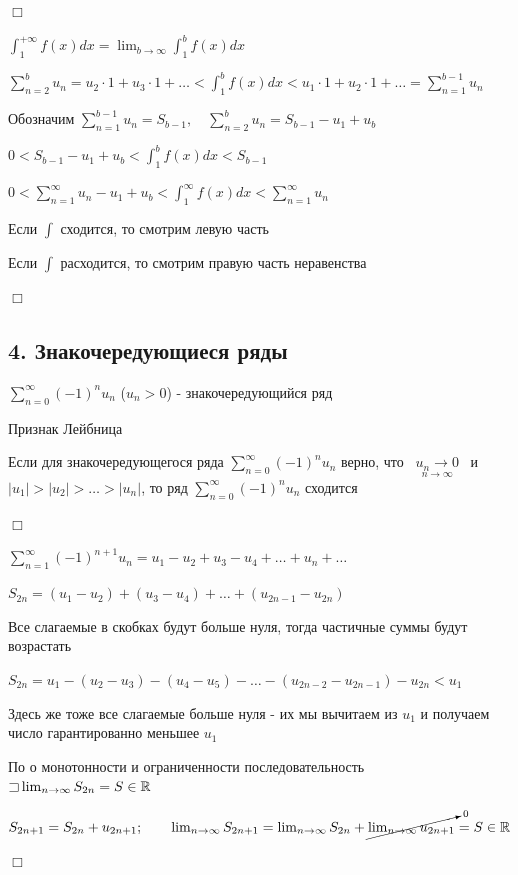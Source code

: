 \documentclass[12pt]{article}
\begin{document}
    \begin{MyProof}
        $\Box$

        $\int_1^{+\infty} f(x) dx = \lim_{b \to \infty} \int_1^b f(x) dx$

        $\sum_{n = 2}^b u_n = u_2 \cdot 1 + u_3 \cdot 1 + \dots < \int_1^b f(x) dx < u_1 \cdot 1 + u_2 \cdot 1 + \dots = \sum_{n = 1}^{b - 1} u_n$

        Обозначим $\sum_{n = 1}^{b - 1} u_n = S_{b - 1}, \quad \sum_{n = 2}^{b} u_n = S_{b - 1} - u_1 + u_b$

        $0 < S_{b - 1} - u_1 + u_b < \int_1^b f(x) dx < S_{b - 1}$

        $0 < \sum_{n = 1}^{\infty} u_n - u_1 + u_b < \int_1^\infty f(x) dx < \sum_{n = 1}^\infty u_n$

        Если $\int$ сходится, то смотрим левую часть

        Если $\int$ расходится, то смотрим правую часть неравенства

        $\Box$
    \end{MyProof}

    \subsection{4. Знакочередующиеся ряды}

    \Def $\sum_{n = 0}^\infty (-1)^n u_n$ ($u_n > 0$) - знакочередующийся ряд

    \begin{MyTheorem}
        \Ths Признак Лейбница

        Если для знакочередующегося ряда $\sum_{n = 0}^\infty (-1)^n u_n$ верно,
        что \ $\underset{n \to \infty}{u_n \to 0}$ \ и \ $|u_1| > |u_2| > \dots > |u_n|$,
        то ряд $\sum_{n = 0}^\infty (-1)^n u_n$ сходится
    \end{MyTheorem}


    \begin{MyProof}
        $\Box$

        $\sum_{n = 1}^\infty (-1)^{n + 1} u_n = u_1 - u_2 + u_3 - u_4 + \dots + u_n + \dots$

        $S_{2n} = (u_1 - u_2) + (u_3 - u_4) + \dots + (u_{2n - 1} - u_{2n})$

        Все слагаемые в скобках будут больше нуля, тогда частичные суммы будут возрастать

        $S_{2n} = u_1 - (u_2 - u_3) - (u_4 - u_5) - \dots - (u_{2n - 2} - u_{2n - 1}) - u_{2n} < u_1$

        Здесь же тоже все слагаемые больше нуля - их мы вычитаем из $u_1$ и получаем число гарантированно меньшее $u_1$

        По \Ths о монотонности и ограниченности последовательность $\mathord{\sqsupset} \lim_{n \to \infty} S_{2n} = S \in \mathbb{R}$

        $S_{2n + 1} = S_{2n} + u_{2n + 1}; \qquad \lim_{n \to \infty} S_{2n + 1} = \lim_{n \to \infty} S_{2n} + \cancelto{0}{\lim_{n \to \infty} u_{2n + 1}} = S \in \mathbb{R}$

        $\Box$
    \end{MyProof}
\end{document}
